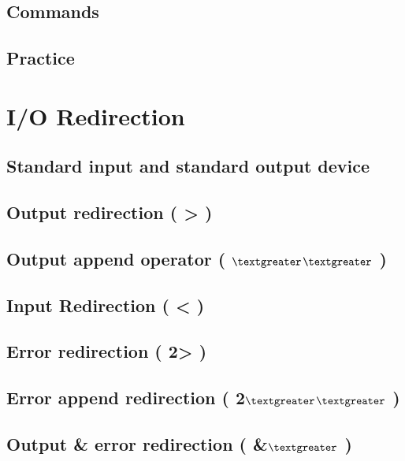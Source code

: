 \documentclass[14pt,fleqn]{extbook} %
\begin{document}
\subsection{Commands}

\subsection{Practice}


\section{I/O Redirection}

\subsection{Standard input and standard output device}

\subsection{Output redirection ( > )}

\subsection{Output append operator ( \textbf{{$\textgreater$}}\textbf{{$\textgreater$}} )}

\subsection{Input Redirection ( < )}

\subsection{Error redirection ( 2> )}

\subsection{Error append redirection ( 2\textbf{{$\textgreater$}}\textbf{{$\textgreater$}} )}

\subsection{Output \& error redirection ( \&\textbf{{$\textgreater$}} )}

\end{document}

